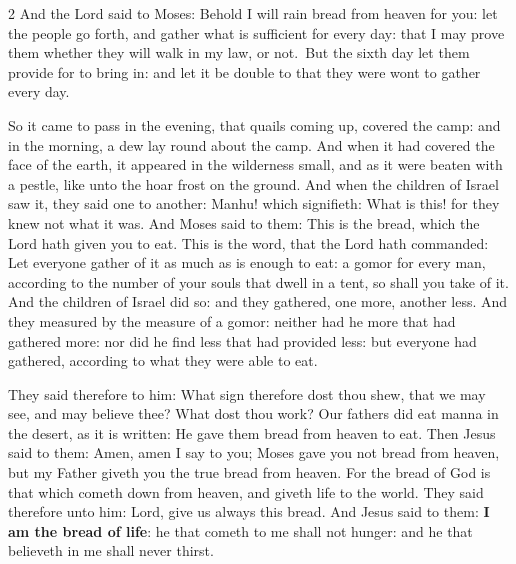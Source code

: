 \begin{multicols}{2}\small
And the Lord said to Moses: Behold I will rain bread from heaven for you: let the people go forth, and gather what is sufficient for every day: that I may prove them whether they will walk in my law, or not. But the sixth day let them provide for to bring in: and let it be double to that they were wont to gather every day. 

So it came to pass in the evening, that quails coming up, covered the camp: and in the morning, a dew lay round about the camp. And when it had covered the face of the earth, it appeared in the wilderness small, and as it were beaten with a pestle, like unto the hoar frost on the ground. And when the children of Israel saw it, they said one to another: Manhu! which signifieth: What is this! for they knew not what it was. And Moses said to them: This is the bread, which the Lord hath given you to eat. This is the word, that the Lord hath commanded: Let everyone gather of it as much as is enough to eat: a gomor for every man, according to the number of your souls that dwell in a tent, so shall you take of it. And the children of Israel did so: and they gathered, one more, another less. And they measured by the measure of a gomor: neither had he more that had gathered more: nor did he find less that had provided less: but everyone had gathered, according to what they were able to eat. 

They said therefore to him: What sign therefore dost thou shew, that we may see, and may believe thee? What dost thou work? Our fathers did eat manna in the desert, as it is written: He gave them bread from heaven to eat. Then Jesus said to them: Amen, amen I say to you; Moses gave you not bread from heaven, but my Father giveth you the true bread from heaven. For the bread of God is that which cometh down from heaven, and giveth life to the world. They said therefore unto him: Lord, give us always this bread. And Jesus said to them: \textbf{I am the bread of life}: he that cometh to me shall not hunger: and he that believeth in me shall never thirst. 
\end{multicols}

